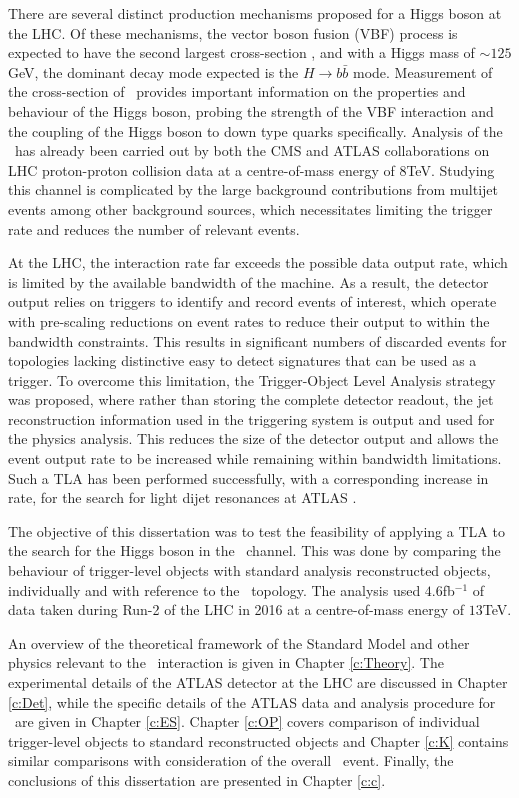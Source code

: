 There are several distinct production mechanisms proposed for a Higgs boson at the LHC. Of these mechanisms, the vector boson fusion (VBF) process is expected to have the second largest cross-section \cite{LHCHiggsCS}, and with a Higgs mass of $\sim125$GeV, the dominant decay mode expected \cite{HDECAY} is the $H\rightarrow b\bar{b}$ mode. Measurement of the cross-section of \VBFHBB\ provides important information on the properties and behaviour of the Higgs boson, probing the strength of the VBF interaction and the coupling of the Higgs boson to down type quarks specifically. Analysis of the \VBFHBB\ has already been carried out by both the CMS \cite{cmsvbfhbb} and ATLAS \cite{VBFHbb8tev} collaborations on LHC proton-proton collision data at a centre-of-mass energy of $8$TeV. Studying this channel is complicated by the large background contributions from multijet events among other background sources, which necessitates limiting the trigger rate and reduces the number of relevant events.

At the LHC, the interaction rate far exceeds the possible data output rate, which is limited by the available bandwidth of the machine. As a result, the detector output relies on triggers to identify and record events of interest, which operate with pre-scaling reductions on event rates to reduce their output to within the bandwidth constraints. This results in significant numbers of discarded events for topologies lacking distinctive easy to detect signatures that can be used as a trigger. To overcome this limitation, the Trigger-Object Level Analysis strategy was proposed, where rather than storing the complete detector readout, the jet reconstruction information used in the triggering system is output and used for the physics analysis. This reduces the size of the detector output and allows the event output rate to be increased while remaining within bandwidth limitations. Such a TLA has been performed successfully, with a corresponding increase in rate, for the search for light dijet resonances at ATLAS \cite{tla}.

The objective of this dissertation was to test the feasibility of applying a TLA to the search for the Higgs boson in the \VBFHBB\ channel. This was done by comparing the behaviour of trigger-level objects with standard analysis reconstructed objects, individually and with reference to the \VBFHBB\ topology. The analysis used $4.6$fb$^{-1}$ of data taken during Run-2 of the LHC in 2016 at a centre-of-mass energy of $13$TeV.

An overview of the theoretical framework of the Standard Model and other physics relevant to the \VBFHBB\ interaction is given in Chapter \ref{c:Theory}. The experimental details of the ATLAS detector at the LHC are discussed in Chapter \ref{c:Det}, while the specific details of the ATLAS data and analysis procedure for \VBFHBB\ are given in Chapter \ref{c:ES}. Chapter \ref{c:OP} covers comparison of individual trigger-level objects to standard reconstructed objects and Chapter \ref{c:K} contains similar comparisons with consideration of the overall \VBFHBB\ event. Finally, the conclusions of this dissertation are presented in Chapter \ref{c:c}.


